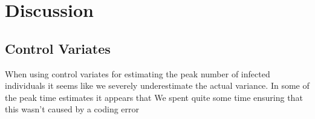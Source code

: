 
\section{Discussion}
\subsection{Control Variates}
When using control variates for estimating the peak number of infected individuals it seems like we severely underestimate the actual variance. In some of the peak time estimates it appears that  We spent quite some time ensuring that this wasn't caused by a coding error